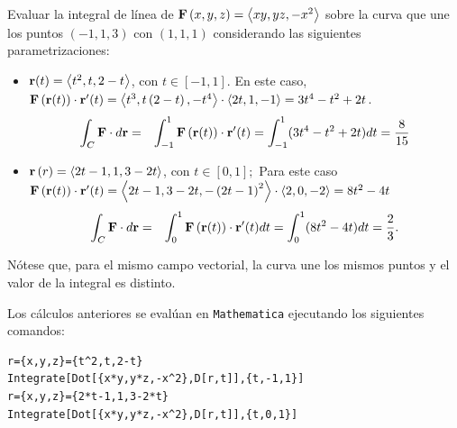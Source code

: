\begin{ejemplo} \label{integraldelinea}
  Evaluar la integral de línea de ${\bf F}\left( x,y,z\right) =\left\langle xy,yz,-x^{2}\right\rangle $ sobre la curva que une los puntos $\left(-1,1,3\right) $ con
  $\left( 1,1,1\right)$ considerando las siguientes parametrizaciones:

  \begin{itemize}
    \item ${\bf r}(t) =\left\langle t^{2},t,2-t\right\rangle $, con $t\in[-1,1]$. En este caso,\\ ${\bf F}\left({\bf r}(t) \right) \cdot {\bf r}^{\prime }(t)= \left\langle t^{3},t\left( 2-t\right) ,-t^{4}\right\rangle \cdot \left\langle 2t,1,-1\right\rangle = 3t^{4}-t^{2}+2t$.
      \begin{eqnarray*}
        \int_{C}{\bf F}\cdot d{\bf r} &=&\int_{-1}^{1}{\bf F}\left({\bf r}(t) \right) \cdot {\bf r}^{\prime }(t)
        = \int_{-1}^{1}(3t^{4}-t^{2}+2t) dt= \frac{8}{15}
      \end{eqnarray*}

    \item ${\bf r}\left( r\right) =\left\langle 2t-1,1,3-2t\right\rangle $, con $t\in [0,1];$ Para este caso ${\bf F}\left({\bf r}(t) \right) \cdot {\bf r}^{\prime }(t)= \left\langle 2t-1,3-2t,-\left( 2t-1\right) ^{2}\right\rangle \cdot \left\langle 2,0,-2\right\rangle = 8t^{2}-4t$
      \begin{eqnarray*}
        \int_{C}{\bf F}\cdot d{\bf r}&=& \int_{0}^{1}{\bf F}\left({\bf r}(t) \right) \cdot {\bf r}^{\prime }(t) dt = \int_{0}^{1} (8t^{2}-4t) dt = \frac{2}{3}.
      \end{eqnarray*}
  \end{itemize}
  Nótese que, para el mismo campo vectorial, la curva une los mismos puntos y el valor de la integral es distinto.
\end{ejemplo}

Los cálculos anteriores se evalúan en \verb"Mathematica" ejecutando los siguien\-tes comandos:

\begin{tcolorbox}[title=\bf Instrucción \verb"Mathematica"]\begin{Verbatim}[formatcom=\letraverbatim]
r={x,y,z}={t^2,t,2-t}
Integrate[Dot[{x*y,y*z,-x^2},D[r,t]],{t,-1,1}]
r={x,y,z}={2*t-1,1,3-2*t}
Integrate[Dot[{x*y,y*z,-x^2},D[r,t]],{t,0,1}]
\end{Verbatim}
\end{tcolorbox}

